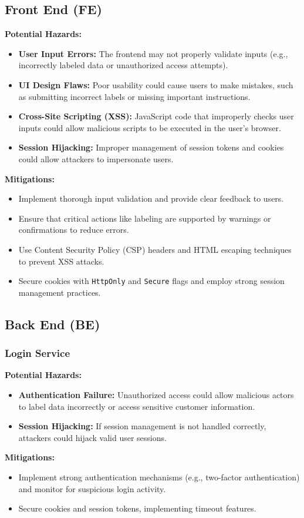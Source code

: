 \documentclass{article}
\begin{document}
\subsection{Front End (FE)}
\textbf{Potential Hazards:}
\begin{itemize}
    \item \textbf{User Input Errors:} The frontend may not properly validate inputs (e.g., incorrectly labeled data or unauthorized access attempts).
    \item \textbf{UI Design Flaws:} Poor usability could cause users to make mistakes, such as submitting incorrect labels or missing important instructions.
    \item \textbf{Cross-Site Scripting (XSS):} JavaScript code that improperly checks user inputs could allow malicious scripts to be executed in the user's browser.
    \item \textbf{Session Hijacking:} Improper management of session tokens and cookies could allow attackers to impersonate users.
\end{itemize}
\textbf{Mitigations:}
\begin{itemize}
    \item Implement thorough input validation and provide clear feedback to users.
    \item Ensure that critical actions like labeling are supported by warnings or confirmations to reduce errors.
    \item Use Content Security Policy (CSP) headers and HTML escaping techniques to prevent XSS attacks.
    \item Secure cookies with \texttt{HttpOnly} and \texttt{Secure} flags and employ strong session management practices.
\end{itemize}

\subsection{Back End (BE)}
\subsubsection{Login Service}
\textbf{Potential Hazards:}
\begin{itemize}
    \item \textbf{Authentication Failure:} Unauthorized access could allow malicious actors to label data incorrectly or access sensitive customer information.
    \item \textbf{Session Hijacking:} If session management is not handled correctly, attackers could hijack valid user sessions.
\end{itemize}
\textbf{Mitigations:}
\begin{itemize}
    \item Implement strong authentication mechanisms (e.g., two-factor authentication) and monitor for suspicious login activity.
    \item Secure cookies and session tokens, implementing timeout features.
\end{itemize}
\end{document}
